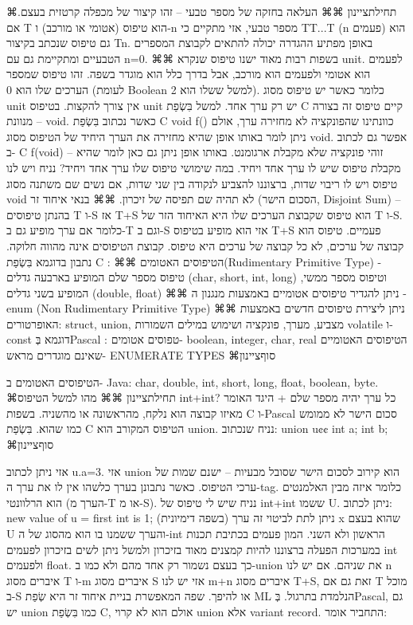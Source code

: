       ⌘תחילת{ציינון}
      ⌘⌘ העלאה בחזקה של מספר טבעי – זהו קיצור של מכפלה קרטזית בעצם. אם T הוא טיפוס (אטומי או מורכב) ו-n מספר טבעי, אזי מתקיים כי TT...T (n פעמים) הוא גם טיפוס שנכתב בקיצור Tn.
      באופן מפתיע ההגדרה יכולה להתאים לקבוצת המספרים הטבעיים ומתקיימת גם עם n=0.
      ⌘⌘ בשפות רבות מאוד ישנו טיפוס שנקרא unit. לפעמים הוא אטומי ולפעמים הוא מורכב, אבל בדרך כלל הוא מוגדר בשפה. זהו טיפוס שמספר הערכים שלו הוא 0 (לעומת Boolean למשל ששלו הוא 2). כלומר כאשר יש טיפוס מסוג unit אין צורך להקצות.
      בטיפוס unit יש רק ערך אחד. למשל בִּשְׂפַת C קיים טיפוס זה בצורה מנוונת – void. כאשר נכתוב בִּשְׂפַת C void f(){} כוונתינו שהפונקציה לא מחזירה ערך, אולם ניתן לומר באותו אופן שהיא מחזירה את הערך היחיד של הטיפוס מסוג void. אפשר גם לכתוב ב- C f(void) – זוהי פונקציה שלא מקבלת ארגומנט. באותו אופן ניתן גם כאן לומר שהיא מקבלת טיפוס שיש לו ערך אחד ויחיד.
      במה שימושי טיפוס שלו ערך אחד ויחיד?
      נניח ויש לנו טיפוס ויש לו ריבוי שדות, ברצוננו להצביע לנקודה בין שני שדות, אם נשים שם משתנה מסוג void לא תהיה שם תפיסה של זיכרון.
      ⌘⌘ בנאי איחוד זר (הסכום הישר, Disjoint Sum) – בהנתן טיפוסים T ו-S אז T+S הוא טיפוס שקבוצת הערכים שלו היא האיחוד הזר של T ו-S. כלומר אם ערך מופיע גם ב-T וגם ב-S אזי הוא מופיע בטיפוס T+S פעמיים. טיפוס הוא קבוצה של ערכים, לא כל קבוצה של ערכים היא טיפוס.
      קבוצת הטיפוסים אינה מהווה חלוקה.
      נתבון בדוגמא בִּשְׂפַת C :
      ⌘⌘ הטיפוסים האטומים(Rudimentary Primitive Type) - טיפוס מספר שלם המופיע בארבעה גדלים (char, short, int, long) וטיפוס מספר ממשי, המופיע בשני גדלים
      (double, float)
      ⌘⌘ ניתן להגדיר טיפוסים אטומיים באמצעות מנגנון ה - enum
      (Non Rudimentary Primitive Type)
      ⌘⌘ ניתן ליצירת טיפוסים חדשים באמצעות האופרטורים: struct, union, מצביע, מערך, פונקציה ושימוש במילים השמורות volatile ו- const
      דוגמא בְּPascal :
      טפוסים אטומים- boolean, integer, char, real
      הטיפוסים האטומיים שאינם מוגדרים מראש- ENUMERATE TYPES
  ⌘סוף{ציינון}

      הטיפוסים האטומים ב- Java:
      char, double, int, short, long, float, boolean, byte.
      ⌘תחילת{ציינון}
      ⌘⌘
      מהו למשל הטיפוס int+int? כל ערך יהיה מספר שלם + היגד האומר מאיזו קבוצה הוא נלקח, מהראשונה או מהשניה. בשפות C ו-Pascal סכום הישר לא ממומש כמו שהוא. בִּשְׂפַת C הטיפוס המקורב הוא union. נניח שנכתוב:
      union u{¢¢
        int a;
        int b;
      }
  ⌘סוף{ציינון}

      אזי ניתן לכתוב u.a=3. אזי union הוא קירוב לסכום הישר שסובל מבעיות – ישנם שמות של ערכי הטיפוס. כאשר נתבונן בערך כלשהו אין לו את ערך ה-tag. כלומר איזה מבין האלמנטים הוא הרלוונטי (הערך מ-T או מ-S).
      נניח שיש לי טיפוס של int+int ששמו U. ניתן לכתוב:
      new value of u = first int is 1; (בשפה דימיונית)
      ניתן לתת לביטוי זה ערך x שהוא בעצם U והערך ששמנו בו הוא מהסוג של ה-int הראשון ולא השני. המון פעמים בכתיבת תכנות במערכות הפעלה ברצוננו להיות קמצנים מאוד בזיכרון ולמשל ניתן לשים בזיכרון לפעמים int ולפעמים float. כך בעצם נשמור רק אחד מהם ולא כמו ב-union את שניהם.
      אם יש לנו n איברים מסוג T ו-m איברים מסוג S אזי יש לנו m+n איברים מסוג T+S, זאת גם אם T מוכל ב-S או להיפך. שפה המאפשרת בניית איחוד זר היא שְׂפַת ML הנלמדת בתרגול.
      בְּPascal, גם יש union כמו בִּשְׂפַת C, אולם הוא לא קרוי union אלא variant record. התחביר אומר:

